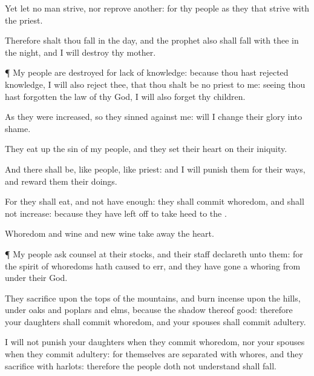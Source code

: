 {Yet let no
man
strive, nor
reprove
another: for thy
people
{} as they that
strive with the
priest.

Therefore shalt thou
fall in the
day, and the
prophet also shall
fall with thee in the
night, and I will
destroy thy
mother.


\par }{\PP {}¶ My
people are
destroyed for lack of
knowledge: because thou hast
rejected
knowledge, I will also
reject thee, that thou shalt be no
priest to me: seeing thou hast
forgotten the
law of thy
God, I will also
forget thy
children.

As they were
increased, so they
sinned against me:
{} will I
change their
glory into
shame.

They eat
up the
sin of my
people, and they
set their
heart on their
iniquity.

And there shall be, like
people, like
priest: and I will
punish them for their
ways, and
reward them their
doings.

For they shall
eat, and not have
enough: they shall commit
whoredom, and shall not
increase: because they have left
off to take
heed to the
{}.

Whoredom and
wine and new
wine take
away the
heart.


\par }{\PP {}¶ My
people
ask counsel at their
stocks, and their
staff
declareth unto them: for the
spirit of
whoredoms hath caused
{} to
err, and they have gone a
whoring from under their
God.

They
sacrifice upon the
tops of the
mountains, and burn
incense upon the
hills, under
oaks and
poplars and
elms, because the
shadow thereof
{}
good: therefore your
daughters shall commit
whoredom, and your
spouses shall commit
adultery.

I will not
punish your
daughters when they commit
whoredom, nor your
spouses when they commit
adultery: for themselves are
separated with
whores, and they
sacrifice with
harlots: therefore the
people
{} doth not
understand shall
fall.


}
